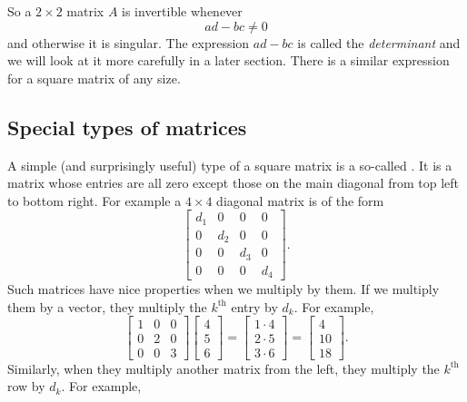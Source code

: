 So a $2 \times 2$ matrix $A$ is invertible whenever
\begin{equation*}
ad - bc \not= 0
\end{equation*}
and otherwise it is singular.  The expression $ad-bc$ is called
the \emph{determinant} and we will look at it 
more carefully in a later section.
There is a similar expression for a square
matrix of any size.

\subsection{Special types of matrices}

A simple (and surprisingly useful) type of a square matrix is a so-called
\emph{}.  It is a matrix whose entries are all zero
except those on the main diagonal from top left to bottom right.  For
example a $4 \times 4$ diagonal matrix is of the form
\begin{equation*}
\begin{bmatrix}
d_1 & 0 & 0 & 0 \\
0 & d_2 & 0 & 0 \\
0 & 0 & d_3 & 0 \\
0 & 0 & 0 & d_4
\end{bmatrix} .
\end{equation*}
Such matrices have nice properties when we multiply by them.  If we multiply
them by a vector, they multiply the $k^{\text{th}}$ entry by $d_k$.  For
example,
\begin{equation*}
\begin{bmatrix}
1 & 0 & 0 \\
0 & 2 & 0 \\
0 & 0 & 3
\end{bmatrix}
\begin{bmatrix}
4 \\ 5 \\ 6
\end{bmatrix}
=
\begin{bmatrix}
1 \cdot 4 \\ 2 \cdot 5 \\ 3 \cdot 6
\end{bmatrix}
=
\begin{bmatrix}
4 \\ 10 \\ 18
\end{bmatrix} .
\end{equation*}
Similarly, when they multiply another matrix from the left, they multiply
the $k^{\text{th}}$ row by $d_k$.  For example,
